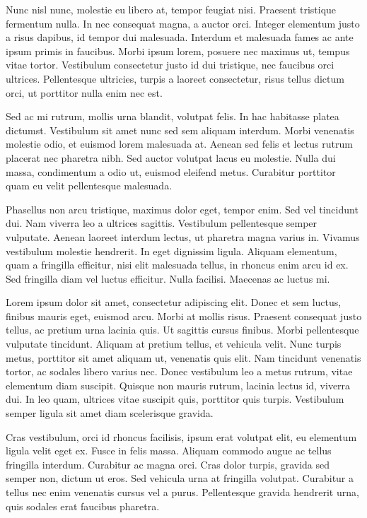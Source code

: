 Nunc nisl nunc, molestie eu libero at, tempor feugiat nisi. Praesent tristique fermentum nulla. In nec consequat magna, a auctor orci. Integer elementum justo a risus dapibus, id tempor dui malesuada. Interdum et malesuada fames ac ante ipsum primis in faucibus. Morbi ipsum lorem, posuere nec maximus ut, tempus vitae tortor. Vestibulum consectetur justo id dui tristique, nec faucibus orci ultrices. Pellentesque ultricies, turpis a laoreet consectetur, risus tellus dictum orci, ut porttitor nulla enim nec est.

Sed ac mi rutrum, mollis urna blandit, volutpat felis. In hac habitasse platea dictumst. Vestibulum sit amet nunc sed sem aliquam interdum. Morbi venenatis molestie odio, et euismod lorem malesuada at. Aenean sed felis et lectus rutrum placerat nec pharetra nibh. Sed auctor volutpat lacus eu molestie. Nulla dui massa, condimentum a odio ut, euismod eleifend metus. Curabitur porttitor quam eu velit pellentesque malesuada.

Phasellus non arcu tristique, maximus dolor eget, tempor enim. Sed vel tincidunt dui. Nam viverra leo a ultrices sagittis. Vestibulum pellentesque semper vulputate. Aenean laoreet interdum lectus, ut pharetra magna varius in. Vivamus vestibulum molestie hendrerit. In eget dignissim ligula. Aliquam elementum, quam a fringilla efficitur, nisi elit malesuada tellus, in rhoncus enim arcu id ex. Sed fringilla diam vel luctus efficitur. Nulla facilisi. Maecenas ac luctus mi.

Lorem ipsum dolor sit amet, consectetur adipiscing elit. Donec et sem luctus, finibus mauris eget, euismod arcu. Morbi at mollis risus. Praesent consequat justo tellus, ac pretium urna lacinia quis. Ut sagittis cursus finibus. Morbi pellentesque vulputate tincidunt. Aliquam at pretium tellus, et vehicula velit. Nunc turpis metus, porttitor sit amet aliquam ut, venenatis quis elit. Nam tincidunt venenatis tortor, ac sodales libero varius nec. Donec vestibulum leo a metus rutrum, vitae elementum diam suscipit. Quisque non mauris rutrum, lacinia lectus id, viverra dui. In leo quam, ultrices vitae suscipit quis, porttitor quis turpis. Vestibulum semper ligula sit amet diam scelerisque gravida.

Cras vestibulum, orci id rhoncus facilisis, ipsum erat volutpat elit, eu elementum ligula velit eget ex. Fusce in felis massa. Aliquam commodo augue ac tellus fringilla interdum. Curabitur ac magna orci. Cras dolor turpis, gravida sed semper non, dictum ut eros. Sed vehicula urna at fringilla volutpat. Curabitur a tellus nec enim venenatis cursus vel a purus. Pellentesque gravida hendrerit urna, quis sodales erat faucibus pharetra.

